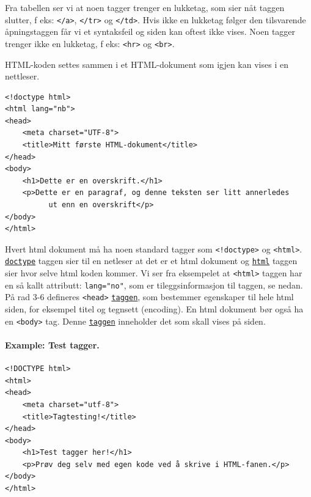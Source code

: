 \documentclass[%
oneside,                 %
final,                   %
12pt]{article}
\newenvironment{notice_mdfboxadmon}[1][]{
\begin{notice_mdfboxmdframed}[frametitle=#1]
}
{
\end{notice_mdfboxmdframed}
}
\newenvironment{block_mdfboxadmon}[1][]{
\begin{block_mdfboxmdframed}[frametitle=#1]
}
{
\end{block_mdfboxmdframed}
}
\begin{document}
Fra tabellen ser vi at noen tagger trenger en lukketag, som sier nåt
taggen slutter, f eks: \texttt{</a>}, \texttt{</tr>} og \texttt{</td>}. Hvis ikke en
lukketag følger den tilsvarende åpningstaggen får vi et syntaksfeil og
siden kan oftest ikke vises. Noen tagger trenger ikke en lukketag, f
eks: \texttt{<hr>} og \texttt{<br>}.

HTML-koden settes sammen i et HTML-dokument som igjen kan vises i en
nettleser.


\begin{block_mdfboxadmon}[]
\begin{verbatim}
<!doctype html>
<html lang="nb">
<head>
	<meta charset="UTF-8">
	<title>Mitt første HTML-dokument</title>
</head>
<body>
	<h1>Dette er en overskrift.</h1> 
	<p>Dette er en paragraf, og denne teksten ser litt annerledes 
          ut enn en overskrift</p>
</body>
</html>
\end{verbatim}
\end{block_mdfboxadmon}



Hvert html dokument må ha noen standard tagger som \Verb?<!doctype>? og
\texttt{<html>}. \href{{http://www.w3schools.com/tags/tag_doctype.asp}}{\nolinkurl{doctype}}
taggen sier til en netleser at det er et html dokument og
\href{{http://www.w3schools.com/tags/tag_html.asp}}{\nolinkurl{html}} taggen sier hvor
selve html koden kommer. Vi ser fra eksempelet at \texttt{<html>} taggen har
en så kallt attributt: \texttt{lang="no"}, som er tileggsinformasjon til
taggen, se nedan. På rad 3-6 defineres \texttt{<head>}
\href{{http://www.w3schools.com/tags/tag_head.asp}}{\nolinkurl{taggen}}, som bestemmer
egenskaper til hele html siden, for eksempel titel og tegnsett
(encoding). En html dokument bør også ha en \texttt{<body>} tag. Denne
\href{{http://www.w3schools.com/tags/tag_body.asp}}{\nolinkurl{taggen}} inneholder det
som skall vises på siden.

\paragraph{Example: Test tagger.}
\label{example:testtagger}


\begin{notice_mdfboxadmon}
\begin{verbatim}
<!DOCTYPE html>
<html>
<head>
    <meta charset="utf-8">
    <title>Tagtesting!</title>
</head>
<body>
    <h1>Test tagger her!</h1>
    <p>Prøv deg selv med egen kode ved å skrive i HTML-fanen.</p>
</body>
</html>
\end{verbatim}
\end{notice_mdfboxadmon}
\end{document}
